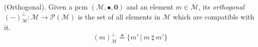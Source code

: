 \begin{defn}
	\label{defn:orthogonal}
	(Orthogonal).
	Given a pcm $(\mathcal{M}, \bullet, \mathbf{0})$ and an element $m \in \mathcal{M}$, its \emph{orthogonal} $(-)^\bot_\mathcal{M} : \mathcal{M} \rightarrow \mathcal{P}(\mathcal{M})$ is the set of all elements in $\mathcal{M}$ which are compatible with it.
\[
	(m)^\bot_\mathcal{M} \triangleq \{m'\ |\ m\ \sharp\ m' \}
\]
\end{defn}